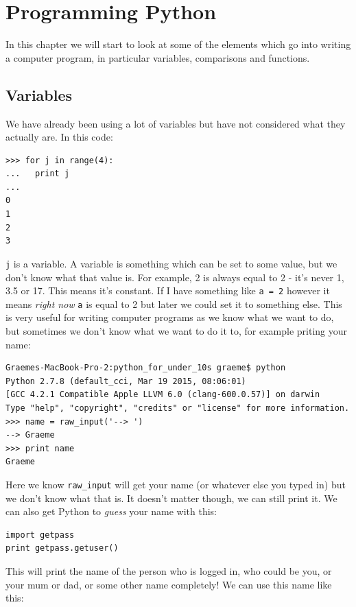 \documentclass[a4paper, 11pt]{book}
\begin{document}
\chapter{Programming Python}

In this chapter we will start to look at some of the elements which go
into writing a computer program, in particular variables, comparisons
and functions.

\section{Variables}

We have already been using a lot of variables but have not considered
what they actually are. In this code:

{\small
\begin{verbatim}
>>> for j in range(4):
...   print j
... 
0
1
2
3
\end{verbatim}
}

\noindent
\verb|j| is a variable. A variable is something which can be set to
some value, but we don't know what that value is. For example, 2 is
always equal to 2 - it's never 1, 3.5 or 17. This means it's
constant. If I have something like \verb|a = 2| however it means
\emph{right now} \verb|a| is equal to 2 but later we could set it to
something else. This is very useful for writing computer programs as
we know what we want to do, but sometimes we don't know what we want
to do it to, for example priting your name:

{\small
\begin{verbatim}
Graemes-MacBook-Pro-2:python_for_under_10s graeme$ python
Python 2.7.8 (default_cci, Mar 19 2015, 08:06:01) 
[GCC 4.2.1 Compatible Apple LLVM 6.0 (clang-600.0.57)] on darwin
Type "help", "copyright", "credits" or "license" for more information.
>>> name = raw_input('--> ')
--> Graeme
>>> print name
Graeme
\end{verbatim}
}

Here we know \verb|raw_input| will get your name (or whatever else you
typed in) but we don't know what that is. It doesn't matter though, we
can still print it. We can also get Python to \emph{guess} your name
with this:

{\small
\begin{verbatim}
import getpass
print getpass.getuser()
\end{verbatim}
}

This will print the name of the person who is logged in, who could be
you, or your mum or dad, or some other name completely! We can use
this name like this:
\end{document}
